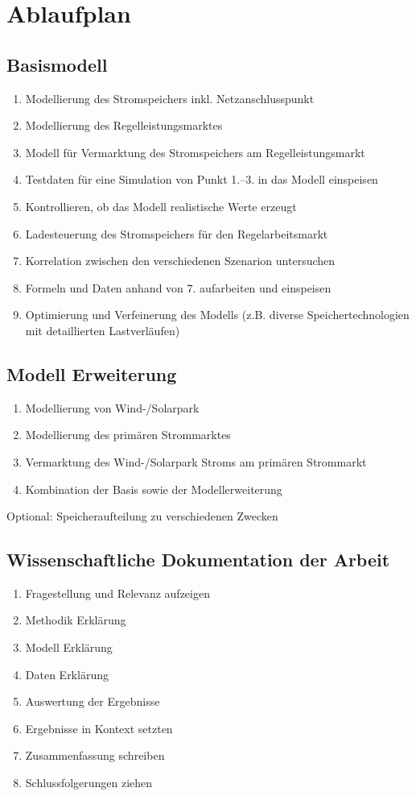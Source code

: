\documentclass[british,         %
BCOR=2mm,                       %
11pt,                           %
a4paper,						%
oneside,						%
cdgeometry,                     %
toc=chapterentrydotfill,        %
toc=indent,                     %
bibliography=totoc,         	%
listof=totoc,                   %
numbers=noenddot,				%
parskip=full,                   %
cdmath=false					%
]{article}                  %
\begin{document}
\section{Ablaufplan}

\subsection{Basismodell}
\begin{enumerate}
	\item Modellierung des Stromspeichers inkl. Netzanschlusspunkt
	\item Modellierung des Regelleistungsmarktes
	\item Modell für Vermarktung des Stromspeichers am Regelleistungsmarkt
	\item Testdaten für eine Simulation von Punkt 1.–3. in das Modell einspeisen
	\item Kontrollieren, ob das Modell realistische Werte erzeugt
	\item Ladesteuerung des Stromspeichers für den Regelarbeitsmarkt
	\item Korrelation zwischen den verschiedenen Szenarion untersuchen
	\item Formeln und Daten anhand von 7. aufarbeiten und einspeisen
	\item Optimierung und Verfeinerung des Modells (z.B. diverse Speichertechnologien mit detaillierten Lastverläufen)
\end{enumerate}

\subsection{Modell Erweiterung}
\begin{enumerate}
	\item 	Modellierung von Wind-/Solarpark
	\item 	Modellierung des primären Strommarktes
	\item 	Vermarktung des Wind-/Solarpark Stroms am primären Strommarkt
	\item 	Kombination der Basis sowie der Modellerweiterung
\end{enumerate}

Optional: Speicheraufteilung zu verschiedenen Zwecken

\subsection{Wissenschaftliche Dokumentation der Arbeit}
\begin{enumerate}
	\item Fragestellung und Relevanz aufzeigen
	\item 	Methodik Erklärung
	\item 	Modell Erklärung
	\item 	Daten Erklärung
	\item 	Auswertung der Ergebnisse
	\item 	Ergebnisse in Kontext setzten
	\item 	Zusammenfassung schreiben
	\item 	Schlussfolgerungen ziehen
\end{enumerate}
\end{document}
